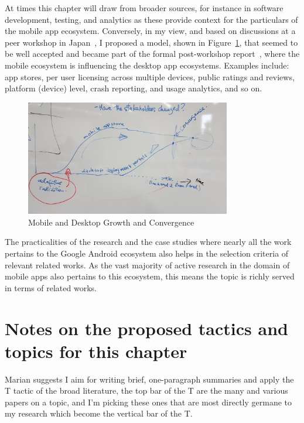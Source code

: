 At times this chapter will draw from broader sources, for instance in software development, testing, and analytics as these provide context for the particulars of the mobile app ecosystem. Conversely, in my view, and based on discussions at a peer workshop in Japan~\citep{nii_shonan_workshop_152}, I proposed a model, shown in Figure~\ref{fig:my_shonan_hysteresis_sketch}, that seemed to be well accepted and became part of the formal post-workshop report~\citep{nii_shonan_152_workshop_report}, where the mobile ecosystem is influencing the desktop app ecosystems. Examples include: app stores, per user licensing across multiple devices, public ratings and reviews, platform (device) level, crash reporting, and usage analytics, and so on.

\begin{figure}
    \centering
    \includegraphics[width=0.8\textwidth]{images/nii-shonan-workshop-152/shonan_hysteresis_diagram_20191210_132528.jpg}
    \caption{Mobile and Desktop Growth and Convergence}
    \label{fig:my_shonan_hysteresis_sketch}
\end{figure}

The practicalities of the research and the case studies where nearly all the work pertains to the Google Android ecosystem also helps in the selection criteria of relevant related works. As the vast majority of active research in the domain of mobile apps also pertains to this ecosystem, this means the topic is richly served in terms of related works.


\section*{Notes on the proposed tactics and topics for this chapter}
Marian suggests I aim for writing brief, one-paragraph summaries and apply the T tactic of the broad literature, the top bar of the T are the many and various papers on a topic, and I'm picking these ones that are most directly germane to my research which become the vertical bar of the T. 

